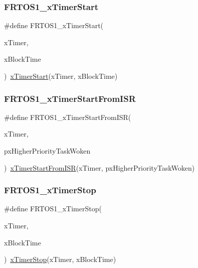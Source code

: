 \subsubsection{\texorpdfstring{F\+R\+T\+O\+S1\+\_\+x\+Timer\+Start}{FRTOS1\_xTimerStart}}
{\footnotesize\ttfamily \#define F\+R\+T\+O\+S1\+\_\+x\+Timer\+Start(\begin{DoxyParamCaption}\item[{}]{x\+Timer,  }\item[{}]{x\+Block\+Time }\end{DoxyParamCaption})~\hyperlink{timers_8h_a3a9b838f48991e852ce05c986b0eeb8c}{x\+Timer\+Start}(x\+Timer, x\+Block\+Time)}

\mbox{\label{group___f_r_t_o_s1__module_ga6b25b13dac5c52cb4b3446715b0de4b5}} 
\subsubsection{\texorpdfstring{F\+R\+T\+O\+S1\+\_\+x\+Timer\+Start\+From\+I\+SR}{FRTOS1\_xTimerStartFromISR}}
{\footnotesize\ttfamily \#define F\+R\+T\+O\+S1\+\_\+x\+Timer\+Start\+From\+I\+SR(\begin{DoxyParamCaption}\item[{}]{x\+Timer,  }\item[{}]{px\+Higher\+Priority\+Task\+Woken }\end{DoxyParamCaption})~\hyperlink{timers_8h_adab5809f9679e44a343b8dbb8fb7c67f}{x\+Timer\+Start\+From\+I\+SR}(x\+Timer, px\+Higher\+Priority\+Task\+Woken)}

\mbox{\label{group___f_r_t_o_s1__module_gabb40a93c1aac5b401432f89a7844bcd4}} 
\subsubsection{\texorpdfstring{F\+R\+T\+O\+S1\+\_\+x\+Timer\+Stop}{FRTOS1\_xTimerStop}}
{\footnotesize\ttfamily \#define F\+R\+T\+O\+S1\+\_\+x\+Timer\+Stop(\begin{DoxyParamCaption}\item[{}]{x\+Timer,  }\item[{}]{x\+Block\+Time }\end{DoxyParamCaption})~\hyperlink{timers_8h_a8327c7fc10aee414cb163b445c5269a4}{x\+Timer\+Stop}(x\+Timer, x\+Block\+Time)}

